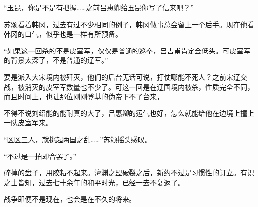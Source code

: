 “玉昆，你是不是有把握……之前吕惠卿给玉昆你写了信来吧？”

苏颂看着韩冈，过去有过不少相同的例子，韩冈做事总会留上一个后手。现在他看韩冈的口气，似乎也是一样有所预备。

“如果这一回杀的不是皮室军，仅仅是普通的巡卒，吕吉甫肯定会低头。可皮室军的背景太深了，不是普通的辽军。”

要是派入大宋境内被歼灭，他们的后台无话可说，打仗哪能不死人？之前宋辽交战，被消灭的皮室军数量也不少了。可这一回是在辽国境内被杀，性质完全不同，而且时间上，也让那位刚刚登基的伪帝下不了台来，

不得不说刘绍能的能耐真的大了，吕惠卿的运气也好，怎么就能给他在边境上撞上一队皮室军来。

“区区三人，就挑起两国之乱……”苏颂摇头感叹。

“不过是一拍即合罢了。”

碎掉的盘子，用胶粘不起来。澶渊之盟破裂之后，新约不过是习惯性的订立。有识之士皆知，过去七十余年的和平时光，已经一去不复返了。

战争即便不是现在，也会是在不久的将来。
